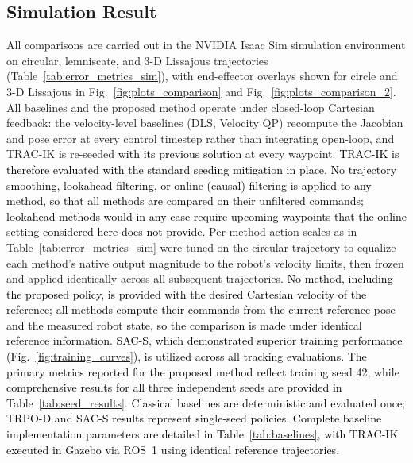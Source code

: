 \documentclass[preprint,12pt]{elsarticle}
\begin{document}
\subsection{Simulation Result}
\label{sim_result}
All comparisons are carried out in the NVIDIA Isaac Sim simulation
environment on circular, lemniscate, and 3-D Lissajous trajectories
(Table~\ref{tab:error_metrics_sim}), with end-effector overlays shown for circle and 3-D Lissajous in Fig.~\ref{fig:plots_comparison} and Fig.~\ref{fig:plots_comparison_2}. All baselines and the proposed method operate under closed-loop Cartesian feedback: the velocity-level baselines (DLS, Velocity QP) recompute the Jacobian and pose error at every control timestep rather than integrating open-loop, and TRAC-IK is re-seeded \textcolor{black}{with its previous solution} at every waypoint. \textcolor{black}{TRAC-IK is therefore evaluated with the standard seeding mitigation in place. No trajectory smoothing, lookahead filtering, or online (causal) filtering is applied to any method, so that all methods are compared on their unfiltered commands; lookahead methods would in any case require upcoming waypoints that the online setting considered here does not provide.} Per-method action scales as in Table~\ref{tab:error_metrics_sim} were tuned on the circular trajectory to equalize each method's native output magnitude to the robot's velocity limits, then frozen and applied identically across all subsequent trajectories. \textcolor{black}{No method, including the proposed policy, is provided with the desired Cartesian velocity of the reference; all methods compute their commands from the current reference pose and the measured robot state, so the comparison is made under identical reference information.} \textcolor{black}{SAC-S, which demonstrated superior training performance (Fig.~\ref{fig:training_curves}), is utilized across all tracking evaluations. The primary metrics reported for the proposed method reflect training seed 42, while comprehensive results for all three independent seeds are provided in Table~\ref{tab:seed_results}. Classical baselines are deterministic and evaluated once; TRPO-D and SAC-S results represent single-seed policies. Complete baseline implementation parameters are detailed in Table~\ref{tab:baselines}, with TRAC-IK executed in Gazebo via ROS~1 using identical reference trajectories.}
\end{document}
